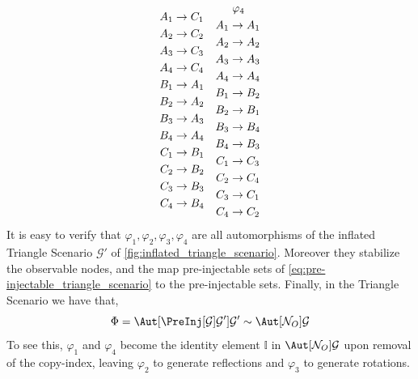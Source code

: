 \documentclass[aps, 10pt, english, twoside, pra, nofootinbib, longbibliography]{revtex4-1}
\theoremstyle{plain}
\theoremstyle{definition}
\theoremstyle{remark}
\newcommand{\graph}{\mathcal{G}}
\newcommand{\nodes}{\mathcal{N}}
\newcommand{\gep}{\varphi}
\newcommand{\gp}{\Phi}
\begin{document}
\begin{equation*}
\begin{aligned}[c]
    A_1 &\to C_1 \\A_2 &\to C_2 \\A_3 &\to C_3 \\A_4 &\to C_4 \\B_1 &\to A_1 \\B_2 &\to A_2 \\B_3 &\to A_3 \\B_4 &\to A_4 \\C_1 &\to B_1 \\C_2 &\to B_2 \\C_3 &\to B_3 \\C_4 &\to B_4
    \end{aligned}
    \quad
    \begin{aligned}[c]
    &\hspace{1mm}\gep_4 \\
    A_1 &\to A_1 \\A_2 &\to A_2 \\A_3 &\to A_3 \\A_4 &\to A_4 \\B_1 &\to B_2 \\B_2 &\to B_1 \\B_3 &\to B_4 \\B_4 &\to B_3 \\C_1 &\to C_3 \\C_2 &\to C_4 \\C_3 &\to C_1 \\C_4 &\to C_2
    \end{aligned}
    \end{equation*}
    It is easy to verify that $\gep_1, \gep_2, \gep_3, \gep_4$ are all automorphisms of the inflated Triangle Scenario $\graph'$ of \cref{fig:inflated_triangle_scenario}. Moreover they stabilize the observable nodes, and the map pre-injectable sets of \cref{eq:pre-injectable_triangle_scenario} to the pre-injectable sets. Finally, in the Triangle Scenario we have that,
    \[ \gp = \Aut[\PreInj[\graph]{\graph'}]{\graph'} \sim \Aut[\nodes_O]{\graph} \]
    To see this, $\gep_1$ and $\gep_4$ become the identity element $\mathbb{I}$ in $\Aut[\nodes_O]{\graph}$ upon removal of the copy-index, leaving $\gep_2$ to generate reflections and $\gep_3$ to generate rotations.
\end{document}
